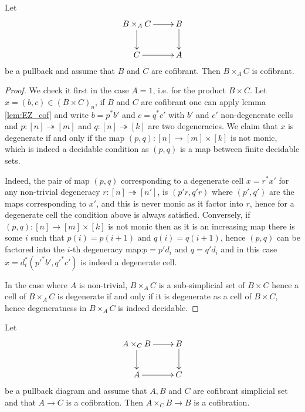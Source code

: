 \documentclass[reqno,10pt,a4paper,oneside,draft]{amsart}
\begin{document}
 






\begin{lemma}\label{lem:cofibrant_fiber_product}
Let 
\[
\xymatrix{
B \times_A C \ar[r] \ar[d] & B \ar[d] \\
C \ar[r] & A }
\]
be a pullback and assume that $B$ and $C$ are cofibrant. Then $B \times_{A} C$ is cofibrant.
\end{lemma}

\begin{proof}
We check it first in the case $A=1$, i.e. for the product $B \times C$. Let $x = (b,c) \in (B \times C)_n$, if $B$ and $C$ are cofibrant one can apply lemma \ref{lem:EZ_cof} and write $b=p^* b'$ and $c=q^* c'$ with $b'$ and $c'$ non-degenerate cells and $p:[n] \twoheadrightarrow [m]$ and $q:[n] \twoheadrightarrow [k]$ are two degeneracies. We claim that $x$ is degenerate if and only if the map $(p,q):[n] \rightarrow [m] \times [k]$ is not monic, which is indeed a decidable condition as $(p,q)$ is a map between finite decidable sets.

Indeed, the pair of map $(p,q)$ corresponding to a degenerate cell $x=r^* x'$ for any non-trivial degeneracy $r:[n] \twoheadrightarrow [n']$, is  $(p'r,q'r)$ where $(p',q')$ are the maps corresponding to $x'$, and this is never monic as it factor into $r$, hence for a degenerate cell the condition above is always satisfied. Conversely, if $(p,q): [n] \rightarrow [m] \times [k]$ is not monic then as it is an increasing map there is some $i$ such that $p(i)=p(i+1)$ and $q(i)=q(i+1)$, hence $(p,q)$ can be factored into the $i$-th degeneracy map:$p=p' d_i$ and $q=q' d_i$ and in this case $x= d_i^* (p'^* b',q'^* c')$ is indeed a degenerate cell.


In the case where $A$ is non-trivial, $B \times_A C$ is a sub-simplicial set of $B \times C$ hence a cell of $B \times_A C$ is degenerate if and only if it is degenerate as a cell of $B \times C$, hence degeneratness in $B \times_A C$ is indeed decidable. 
\end{proof}


\begin{proposition} \label{thm:cof-pbk} Let
\[
\xymatrix{
A \times_C B \ar[r] \ar[d] &  B \ar[d] \\
A \ar[r] & C}
\]
be a pullback diagram and assume that $A,B$ and $C$ are cofibrant simplicial set and that $A \rightarrow C$ is a cofibration. Then $A \times_C B \rightarrow B$ is a cofibration.
\end{proposition}
\end{document}
